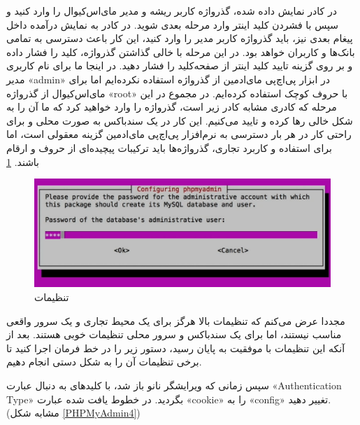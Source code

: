 در کادر نمایش داده شده، گذرواژه کاربر ریشه و مدیر مای‌اس‌کیوال را وارد کنید و سپس با فشردن کلید اینتر وارد مرحله بعدی شوید. در کادر به نمایش درآمده داخل پیغام بعدی نیز، باید گذرواژه کاربر مدیر را وارد کنید، این کار باعث دسترسی به تمامی بانک‌ها و کاربران خواهد بود. در این مرحله با خالی گذاشتن گذرواژه، کلید  
را فشار داده و بر روی گزینه تایید 
 کلید اینتر  
  از صفحه‌کلید را فشار دهید. در اینجا ما برای نام کاربری مدیر «admin» در ابزار پی‌اچ‌پی مای‌ادمین از گذرواژه استفاده نکرده‌ایم اما برای مای‌اس‌کیوال از گذرواژه «root» با حروف کوچک استفاده کرده‌ایم. در مجموع در این مرحله که کادری مشابه کادر زیر است، گذرواژه را وارد خواهید کرد که ما آن را به شکل خالی رها کرده و تایید می‌کنیم. این کار در یک سندباکس به صورت محلی و برای راحتی کار در هر بار دسترسی به نرم‌افزار پی‌اچ‌پی مای‌ادمین گزینه معقولی است، اما برای استفاده و کاربرد تجاری، گذرواژه‌ها باید ترکیبات پیچیده‌ای از حروف و ارقام باشند.
  \ref{PHPMyAdmin3}
\begin{figure}
      \includegraphics[width=.9\textwidth ,height=.35\textwidth]{Pic/PHPADMIN3}
      \caption{ تنظیمات 
        }
        \label{PHPMyAdmin3}
\end{figure}
مجددا عرض می‌کنم که تنظیمات بالا هرگز برای یک محیط تجاری و یک سرور واقعی مناسب نیستند، اما برای یک سندباکس و سرور محلی تنظیمات خوبی هستند. بعد از آنکه این تنظیمات با موفقیت به پایان رسید، دستور زیر را در خط فرمان اجرا کنید تا برخی تنظیمات آن را به شکل دستی انجام دهیم.
\begin{latin}  
    
\end{latin}
سپس زمانی که ویرایشگر نانو باز شد، با کلید‌های 
 به دنبال عبارت «Authentication Type» بگردید. در خطوط یافت شده عبارت «cookie» را به «config» تغییر دهید. (مشابه شکل \ref{PHPMyAdmin4})

